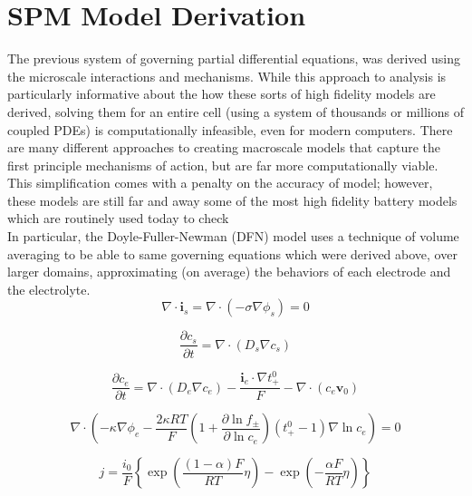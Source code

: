 \documentclass[lettersize,journal]{IEEEtran}
\begin{document}
\section{SPM Model Derivation}

The previous system of governing partial differential equations, was derived using the microscale interactions and mechanisms. While this approach to analysis is particularly informative about the how these sorts of high fidelity models are derived, solving them for an entire cell (using a system of thousands or millions of coupled PDEs) is computationally infeasible, even for modern computers. There are many different approaches to creating macroscale models that capture the first principle mechanisms of action, but are far more computationally viable. This simplification comes with a penalty on the accuracy of model; however, these models are still far and away some of the most high fidelity battery models which are routinely used today to check  \\

In particular, the Doyle-Fuller-Newman (DFN) model uses a technique of volume averaging to be able to same governing equations which were derived above, over larger domains, approximating (on average) the behaviors of each electrode and the electrolyte. \\


\begin{equation} \label{COC_s}
\nabla \cdot \mathbf{i}_{s}=\nabla \cdot\left(-\sigma \nabla \phi_{s}\right)=0
\end{equation}

\begin{equation} \label{COM_s}
\frac{\partial c_{s}}{\partial t}=\nabla \cdot\left(D_{s} \nabla c_{s}\right)
\end{equation}

\begin{equation} \label{COM_e}
\frac{\partial c_{e}}{\partial t}=\nabla \cdot\left(D_{e} \nabla c_{e}\right)-\frac{\mathbf{i}_{e} \cdot \nabla t_{+}^{0}}{F}-\nabla \cdot\left(c_{e} \mathbf{v}_{0}\right)
\end{equation}

\begin{equation}\label{COC_e}
\nabla \cdot\left(-\kappa \nabla \phi_{e}-\frac{2 \kappa R T}{F}\left(1+\frac{\partial \ln f_{\pm}}{\partial \ln c_{e}}\right)\left(t_{+}^{0}-1\right) \nabla \ln c_{e}\right)=0
\end{equation}

\begin{equation} \label{lithium_movment}
j=\frac{i_{0}}{F}\left\{\exp \left(\frac{(1-\alpha) F}{R T} \eta\right)-\exp \left(-\frac{\alpha F}{R T} \eta\right)\right\}
\end{equation}
\end{document}
